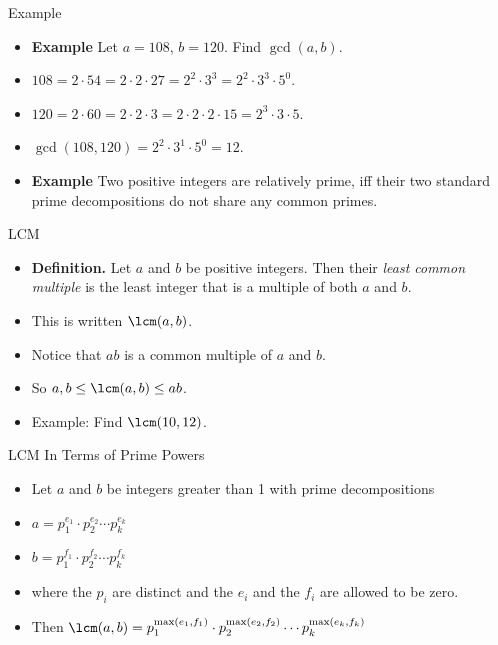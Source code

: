 \documentclass{beamer}
\begin{document}
\begin{frame}{Example}

\begin{itemize}
  \item \textbf{Example} Let $a=108$, $b=120$. Find $\gcd(a,b)$.
  \item $108 = 2 \cdot 54 = 2 \cdot 2 \cdot 27 = 2^2 \cdot 3^3 = 2^2 \cdot 3^3 \cdot 5^0$.
  \item $120 = 2 \cdot 60 = 2 \cdot 2 \cdot 3 = 2\cdot 2 \cdot 2 \cdot 15 = 2^3 \cdot 3 \cdot 5$.
  \item $\gcd(108,120) = 2^2\cdot 3^1 \cdot 5^0 = 12$.
  \item \textbf{Example} Two positive integers are relatively prime, iff their two standard prime
  decompositions do not share any common primes.
\end{itemize}

\end{frame}

\begin{frame}{LCM}

\begin{itemize}
  \item \textbf{Definition.} Let $a$ and $b$ be positive integers.
  Then their \emph{least common multiple} is the least integer that is
  a multiple of both $a$ and $b$.
  \item This is written $\lcm(a,b)$.
  \item Notice that $ab$ is a common multiple of $a$ and $b$.
  \item So $a,b\leq \lcm(a,b) \leq ab$.
  \item Example: Find $\lcm(10,12)$.
\end{itemize}

\end{frame}

\begin{frame}{LCM In Terms of Prime Powers}

\begin{itemize}
  \item Let $a$ and $b$ be integers greater than 1 with prime decompositions
  \item $a=p_1^{e_1} \cdot p_2^{e_2} \cdots p_k^{e_k}$
  \item $b=p_1^{f_1} \cdot p_2^{f_2} \cdots p_k^{f_k}$
  \item where the $p_i$ are distinct and the $e_i$ and the $f_i$ are allowed to be zero.
  \item Then $\lcm(a,b) = p_1^{\max(e_1,f_1)} \cdot p_2^{\max(e_2,f_2)} \cdots p_k^{\max(e_k,f_k)}$
\end{itemize}

\end{frame}
\end{document}
